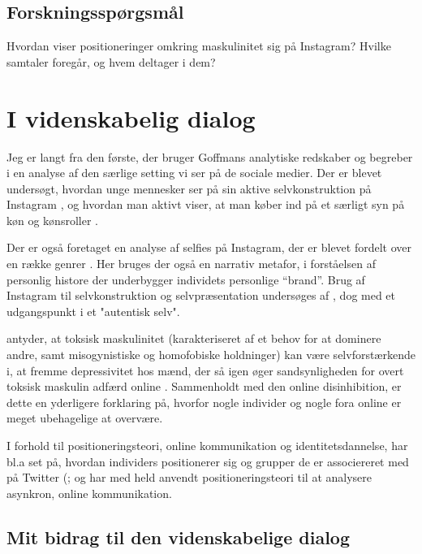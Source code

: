 \subsection{Forskningsspørgsmål}
Hvordan viser positioneringer omkring maskulinitet sig på 
Instagram? Hvilke samtaler foregår, og hvem deltager i dem?

\section{I videnskabelig dialog}

Jeg er langt fra den første, der bruger Goffmans analytiske 
redskaber og begreber i en analyse af den særlige setting vi ser 
på de sociale medier. Der er blevet undersøgt, hvordan unge 
mennesker ser på sin aktive selvkonstruktion på Instagram 
\autocite{seehaferNOFILTERExplorationInstagram2017a}, og hvordan 
man aktivt viser, at man køber ind på et særligt syn på køn og 
kønsroller \autocite{bakerGoodMorningFitfam2018}. 

Der er også foretaget en analyse af selfies på Instagram, der er 
blevet fordelt over en række genrer 
\autocite{eagarClassifyingNarratedSelfie2016}. Her bruges der også 
en narrativ metafor, i forståelsen af personlig histore der 
underbygger individets personlige “brand”. Brug
af Instagram til selvkonstruktion og selvpræsentation undersøges 
af \citeauthor{lazebnaRoleCommunicationApprehension2015}, dog med 
et udgangspunkt i et "autentisk selv".

\citeauthor{parentSocialMediaBehavior2018} antyder, at toksisk 
maskulinitet (karakteriseret af et behov for at dominere andre, 
samt misogynistiske og homofobiske holdninger) kan være 
selvforstærkende i, at fremme depressivitet hos mænd, der så igen 
øger sandsynligheden for overt toksisk maskulin adfærd online 
\autocite{parentSocialMediaBehavior2018}. Sammenholdt med den 
online disinhibition, er dette en yderligere forklaring på, 
hvorfor nogle individer og nogle fora online er meget ubehagelige 
at overvære.

I forhold til positioneringsteori, online kommunikation og 
identitetsdannelse, har bl.a 
\citeauthor{lopezlongTweetingChoirReligious2012} set på, hvordan 
individers positionerer sig og grupper de er associereret med på 
Twitter (\citeyear{lopezlongTweetingChoirReligious2012}; og 
\citeauthor{dennenFacilitatorPresenceIdentity2011} har med held 
anvendt positioneringsteori til at analysere asynkron, online 
kommunikation.

\subsection{Mit bidrag til den videnskabelige dialog}


